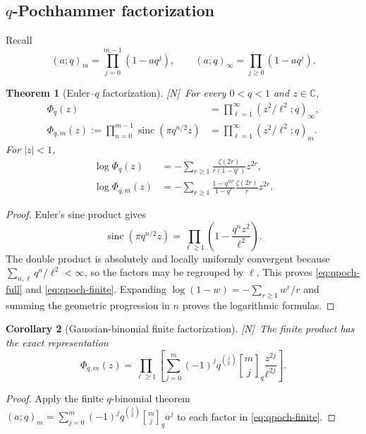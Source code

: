 \documentclass[11pt,oneside]{article}
\newtheorem{theorem}{Theorem}[section]
\newtheorem{corollary}[theorem]{Corollary}
\theoremstyle{definition}
\theoremstyle{remark}
\newcommand{\C}{\mathbb C}
\newcommand{\sinc}{\operatorname{sinc}}
\newcommand{\qbinom}[3]{\genfrac{[}{]}{0pt}{}{#1}{#2}_{#3}}
\newcommand{\statusN}{\textsf{[N]}}
\begin{document}
\subsection{$q$-Pochhammer factorization}
Recall
\[
 (a;q)_m=\prod_{j=0}^{m-1}(1-aq^j),\qquad
 (a;q)_\infty=\prod_{j\ge0}(1-aq^j).
\]

\begin{theorem}[Euler--$q$ factorization]\label{thm:qpoch-sinc}
\statusN\ For every $0<q<1$ and $z\in\C$,
\begin{align}
 \Phi_q(z)&=\prod_{\ell=1}^{\infty}(z^2/\ell^2;q)_\infty,  \label{eq:qpoch-full}\\
 \Phi_{q,m}(z):=\prod_{n=0}^{m-1}\sinc(\pi q^{n/2}z)
 &=\prod_{\ell=1}^{\infty}(z^2/\ell^2;q)_m.                \label{eq:qpoch-finite}
\end{align}
For $|z|<1$,
\begin{align}
 \log\Phi_q(z)
 &=-\sum_{r\ge1}\frac{\zeta(2r)}{r(1-q^r)}z^{2r},         \label{eq:q-log-full}\\
 \log\Phi_{q,m}(z)
 &=-\sum_{r\ge1}\frac{1-q^{mr}}{1-q^r}\frac{\zeta(2r)}r z^{2r}. \label{eq:q-log-finite}
\end{align}
\end{theorem}

\begin{proof}
Euler's sine product gives
\[
 \sinc(\pi q^{n/2}z)=\prod_{\ell\ge1}\left(1-\frac{q^nz^2}{\ell^2}\right).
\]
The double product is absolutely and locally uniformly convergent because
$\sum_{n,\ell}q^n/\ell^2<\infty$, so the factors may be regrouped by $\ell$.  This proves
\eqref{eq:qpoch-full} and \eqref{eq:qpoch-finite}.  Expanding
$\log(1-w)=-\sum_{r\ge1}w^r/r$ and summing the geometric progression in $n$ proves the
logarithmic formulas.
\end{proof}

\begin{corollary}[Gaussian-binomial finite factorization]\label{cor:qbinom-finite}
\statusN\ The finite product has the exact representation
\begin{equation}
 \boxed{
 \Phi_{q,m}(z)=\prod_{\ell\ge1}
 \left[
  \sum_{j=0}^{m}(-1)^jq^{\binom j2}\qbinom mjq\frac{z^{2j}}{\ell^{2j}}
 \right].}                                                  \label{eq:qbinom-sinc}
\end{equation}
\end{corollary}

\begin{proof}
Apply the finite $q$-binomial theorem
$(a;q)_m=\sum_{j=0}^m(-1)^jq^{\binom j2}\qbinom mjq a^j$
to each factor in \eqref{eq:qpoch-finite}.
\end{proof}
\end{document}
